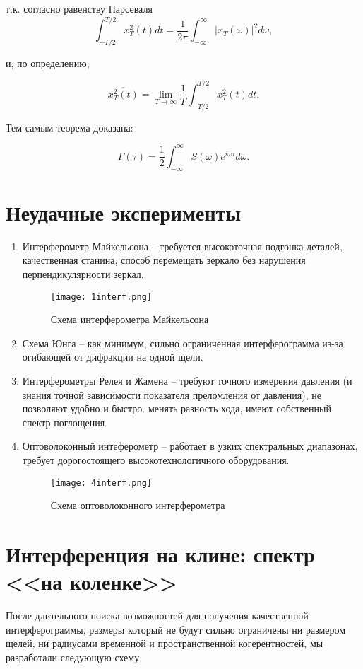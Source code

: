 \documentclass{urticle}
\begin{document}
т.к. согласно равенству Парсеваля
$$ \int_{-T/2}^{T/2} x_T^2(t)dt = \frac{1}{2\pi} \int_{-\infty}^{\infty} |x_T(\omega)|^2 d \omega,$$

и, по определению,

$$
\overline{x_T^2(t)} = \lim\limits_{T\rightarrow\infty} \frac{1}{T} \int_{-T/2}^{T/2} x_T^2(t) dt.$$

Тем самым теорема доказана:

$$\boxed{\Gamma(\tau) = \frac{1}{2}\int_{-\infty}^{\infty} S(\omega) e^{i\omega \tau} d \omega.}$$


\newpage
\section*{Неудачные эксперименты}
\begin{enumerate}
	\item Интерферометр Майкельсона -- требуется высокоточная подгонка деталей, качественная станина, способ перемещать зеркало без нарушения перпендикулярности зеркал.
	\begin{figure}[H]
	\centering
  	\texttt{[image: 1interf.png]}
  \caption{Схема интерферометра Майкельсона}
  \end{figure}
	\item Схема Юнга -- как минимум, сильно ограниченная интерферограмма из-за огибающей от дифракции на одной щели.
	\item Интерферометры Релея и Жамена -- требуют точного измерения давления (и знания точной зависимости показателя преломления от давления), не позволяют удобно и быстро. менять разность хода, имеют собственный спектр поглощения
	\item Оптоволоконный интеферометр -- работает в узких спектральных диапазонах, требует дорогостоящего высокотехнологичного оборудования.
	\begin{figure}[H]
	\centering
  	\texttt{[image: 4interf.png]}
  \caption{Схема оптоволоконного интерферометра}
  \end{figure}
\end{enumerate}

\newpage
\section*{Интерференция на клине: спектр <<на коленке>>}
    После длительного поиска возможностей для получения качественной интерферограммы, размеры который не будут сильно ограничены ни размером щелей, ни радиусами временной и пространственной когерентностей, мы разработали следующую схему.
	
\end{document}
